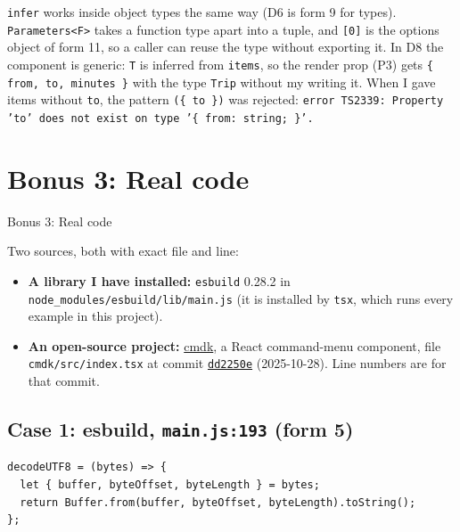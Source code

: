 \documentclass[
  10pt,
]{article}
\providecommand{\tightlist}{%
  \setlength{\itemsep}{0pt}\setlength{\parskip}{0pt}}
\begin{document}
\texttt{infer} works inside object types the same way (D6 is form 9 for
types). \texttt{Parameters<F>} takes a function type apart into a tuple,
and \texttt{[\allowbreak{}0]} is the options object of form 11, so a
caller can reuse the type without exporting it. In D8 the component is
generic: \texttt{T} is inferred from \texttt{items}, so the render prop
(P3) gets \texttt{\{ from,\allowbreak{} to,\allowbreak{} minutes \}}
with the type \texttt{Trip} without my writing it. When I gave items
without \texttt{to}, the pattern \texttt{(\allowbreak{}\{ to \})} was
rejected:
\texttt{error TS2339:\allowbreak{} Property 'to' does not exist on type '\{ from:\allowbreak{} string; \}'.\allowbreak{}}

\hypertarget{bonus-3-real-code}{%
\section{Bonus 3: Real code}\label{bonus-3-real-code}}

Bonus 3: Real code

Two sources, both with exact file and line:

\begin{itemize}
\tightlist
\item
  \textbf{A library I have installed:} \texttt{esbuild} 0.28.2 in
  \texttt{node\_modules/\allowbreak{}esbuild/\allowbreak{}lib/\allowbreak{}main.\allowbreak{}js}
  (it is installed by \texttt{tsx}, which runs every example in this
  project).
\item
  \textbf{An open-source project:}
  \href{https://github.com/pacocoursey/cmdk}{cmdk}, a React command-menu
  component, file
  \texttt{cmdk/\allowbreak{}src/\allowbreak{}index.\allowbreak{}tsx} at
  commit
  \href{https://github.com/pacocoursey/cmdk/blob/dd2250ed608443e8f32bafc5fa2d1d07a3746aa3/cmdk/src/index.tsx}{\texttt{dd2250e}}
  (2025-10-28). Line numbers are for that commit.
\end{itemize}

\hypertarget{case-1-esbuild-mainjs193-form-5}{%
\subsection{\texorpdfstring{Case 1: esbuild,
\texttt{main.\allowbreak{}js:\allowbreak{}193} (form
5)}{Case 1: esbuild,  (form 5)}}\label{case-1-esbuild-mainjs193-form-5}}

\begin{verbatim}
decodeUTF8 = (bytes) => {
  let { buffer, byteOffset, byteLength } = bytes;
  return Buffer.from(buffer, byteOffset, byteLength).toString();
};
\end{verbatim}
\end{document}
